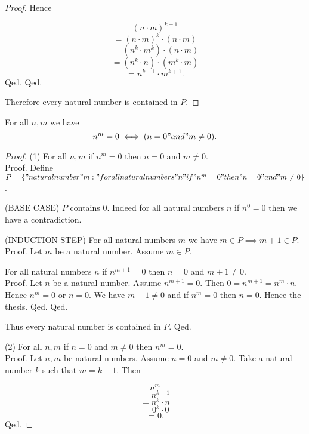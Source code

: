 \documentclass[../../natural-numbers.ftl.tex]{subfiles}
\begin{document}
\begin{forthel}
\begin{proof}
          Hence

          $$  (n \cdot m)^{k + 1}$$
          $$= (n \cdot m)^{k} \cdot (n \cdot m)$$       %
          $$= (n^{k} \cdot m^{k}) \cdot (n \cdot m)$$   %
          $$= (n^{k} \cdot n) \cdot (m^{k} \cdot m)$$   %
          $$= n^{k + 1} \cdot m^{k + 1}.$$              %
        Qed.
      Qed.

      Therefore every natural number is contained in $P$.
    \end{proof}


    \begin{proposition}[NN 01 04 857078]
      For all $n,m$ we have
      $$n^{m} = 0 \iff (n = 0 "and" m \neq 0).$$
    \end{proposition}
    \begin{proof}
      (1) For all $n,m$ if $n^{m} = 0$ then $n = 0$ and $m \neq 0$. \\
      Proof.
        Define $P = \{ "natural number" m : "for all natural numbers" n "if" n^{m} = 0 "then" n = 0 "and" m \neq 0 \}$.

        (BASE CASE) $P$ contains $0$.
        Indeed for all natural numbers $n$ if $n^{0} = 0$ then we have a contradiction.

        (INDUCTION STEP) For all natural numbers $m$ we have $m \in P \implies m + 1 \in P$. \\
        Proof.
          Let $m$ be a natural number.
          Assume $m \in P$.

          For all natural numbers $n$ if $n^{m + 1} = 0$ then $n = 0$ and
          $m + 1 \neq 0$. \\
          Proof.
            Let $n$ be a natural number.
            Assume $n^{m + 1} = 0$.
            Then $0 = n^{m + 1} = n^{m} \cdot n$.
            Hence $n^{m} = 0$ or $n = 0$.
            We have $m + 1 \neq 0$ and if $n^{m} = 0$ then $n = 0$.
            Hence the thesis.
          Qed.
        Qed.

        Thus every natural number is contained in $P$.
      Qed.

      (2) For all $n,m$ if $n = 0$ and $m \neq 0$ then $n^{m} = 0$. \\
      Proof.
        Let $n,m$ be natural numbers.
        Assume $n = 0$ and $m \neq 0$.
        Take a natural number $k$ such that $m = k + 1$.
        Then

        $$  n^{m}$$
        $$= n^{k + 1}$$       %
        $$= n^{k} \cdot n$$   %
        $$= 0^{k} \cdot 0$$   %
        $$= 0.$$              %
      Qed.
    \end{proof}
  \end{forthel}
\end{document}
